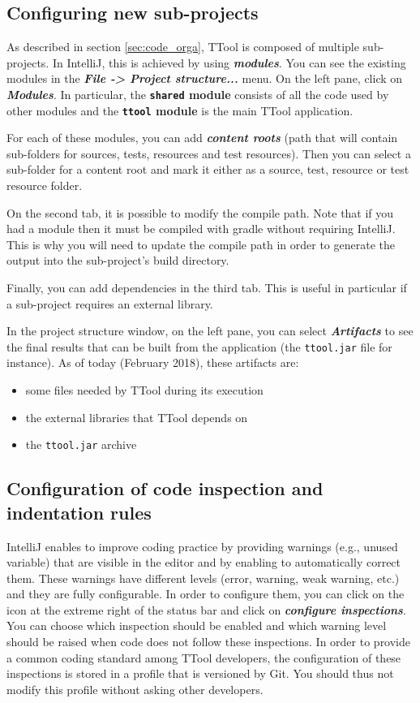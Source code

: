 \documentclass[12pt]{article}
\begin{document}
\subsection{Configuring new sub-projects}
\label{sec:intellij:subprojects}

As described in section \ref{sec:code_orga}, TTool is composed of multiple
sub-projects. In IntelliJ, this is achieved by using \textbf{\emph{modules}}. You can see
the existing modules in the \textbf{\emph{File -> Project structure...}} menu. On the
left pane, click on \textbf{\emph{Modules}}. In particular, the \textbf{\texttt{shared} module }
consists of all the code used by other modules and the \textbf{\texttt{ttool} module} is
the main TTool application.

For each of these modules, you can add \textbf{\emph{content roots}} (path that will
contain sub-folders for sources, tests, resources and test resources). Then you
can select a sub-folder for a content root and mark it either as a source, test,
resource or test resource folder.

On the second tab, it is possible to modify the compile path. Note that if you
had a module then it must be compiled with gradle without requiring IntelliJ.
This is why you will need to update the compile path in order to generate the
output into the sub-project's build directory.

Finally, you can add dependencies in the third tab. This is useful in particular
if a sub-project requires an external library.

In the project structure window, on the left pane, you can select
\textbf{\emph{Artifacts}} to see the final results that can be built from the application
(the \texttt{ttool.jar} file for instance). As of today (February 2018), these
artifacts are:
\begin{itemize}
    \item some files needed by TTool during its execution
    \item the external libraries that TTool depends on
    \item the \texttt{ttool.jar} archive
\end{itemize}

\subsection{Configuration of code inspection and indentation rules}

IntelliJ enables to improve coding practice by providing warnings (e.g., unused
variable) that are
visible in the editor and by enabling to automatically correct them. These
warnings have different levels (error, warning, weak warning, etc.) and they are
fully configurable. In order to configure them, you can click on the icon at the
extreme right of the status bar and click on \textbf{\emph{configure inspections}}. You
can choose which inspection should be enabled and which warning level should be
raised when code does not follow these inspections. In order to provide a
common coding standard among TTool developers, the configuration of these
inspections is stored in a profile that is versioned by Git. You should thus not
modify this profile without asking other developers.
\end{document}
